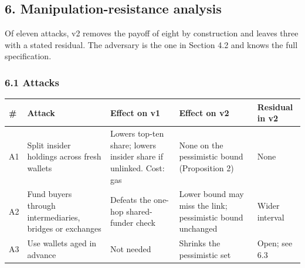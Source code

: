 \subsection{6. Manipulation-resistance analysis}\label{manipulation-resistance-analysis}

Of eleven attacks, v2 removes the payoff of eight by construction and leaves three with a stated residual. The adversary is the one in Section 4.2 and knows the full specification.

\subsubsection{6.1 Attacks}\label{attacks}

{\def\LTcaptype{none} %
\begin{longtable}[]{@{}
  >{\raggedright\arraybackslash}p{}
  >{\raggedright\arraybackslash}p{}
  >{\raggedright\arraybackslash}p{}
  >{\raggedright\arraybackslash}p{}
  >{\raggedright\arraybackslash}p{}@{}}
\toprule\noalign{}
\begin{minipage}[b]{\linewidth}\raggedright
\#
\end{minipage} & \begin{minipage}[b]{\linewidth}\raggedright
Attack
\end{minipage} & \begin{minipage}[b]{\linewidth}\raggedright
Effect on v1
\end{minipage} & \begin{minipage}[b]{\linewidth}\raggedright
Effect on v2
\end{minipage} & \begin{minipage}[b]{\linewidth}\raggedright
Residual in v2
\end{minipage} \\
\midrule\noalign{}
\endhead
\bottomrule\noalign{}
\endlastfoot
A1 & Split insider holdings across fresh wallets & Lowers top-ten share; lowers insider share if unlinked. Cost: gas & None on the pessimistic bound (Proposition 2) & None \\
A2 & Fund buyers through intermediaries, bridges or exchanges & Defeats the one-hop shared-funder check & Lower bound may miss the link; pessimistic bound unchanged & Wider interval \\
A3 & Use wallets aged in advance & Not needed & Shrinks the pessimistic set & Open; see 6.3 \\

\end{longtable}}
